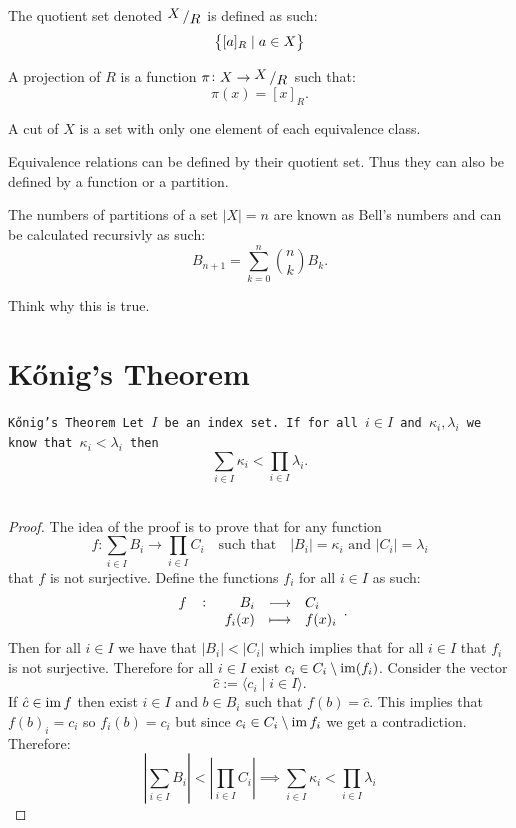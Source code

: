 \documentclass[11pt,a4paper]{article}
\begin{document}
    \begin{definition}
			The quotient set denoted $\bigslant{X}{R}$ is defined as such:
			\[
        \left\{[a]_R \mid a \in X\right\}
			\]
		\end{definition}

    \begin{definition}[Projection]
			A projection of $R$ is a function $\pi \colon X \to \bigslant{X}{R}$
      such that:
			\[
				\pi(x) = [x]_R.
			\]
		\end{definition}

    \begin{definition}[Cut]
			A cut of $X$ is a set with only one element of each 
			equivalence class.
		\end{definition}
	\noindent Equivalence relations can be defined by their quotient set.
	Thus they can also be defined by a function or a partition.
	
  \begin{definition}
  The numbers of partitions of a set $|X|=n$ are known as Bell's numbers 
	and can be calculated recursivly as such:
	\[
    B_{n+1} = \sum_{k=0}^{n} \binom{n}{k} B_k.
	\]
  \end{definition}
	
  Think why this is true.
	
\newpage
\section{Kőnig's Theorem}
  \begin{theorem}\tt{Kőnig's Theorem}
  Let $I$ be an index set. If for all $i \in I$ and 
	$\kappa_i, \lambda_i$ we know that $\kappa_i < \lambda_i$ then
	\[
		\sum_{i\in I} \kappa_i < \prod_{i\in I} \lambda_i.
	\]
	\end{theorem}

  \begin{proof}
    The idea of the proof is to prove that for any function
    \[
      f \colon \sum_{i\in I}{B_i} \to \prod_{i\in I}{C_i} 
      \quad\text{such that}\quad
      |B_i| = \kappa_i \text{ and } |C_i| = \lambda_i
    \]
    that $f$ is not surjective.
    Define the functions $f_i$ for all $i \in I$ as such:
    \[
      \fullfunction{f}{B_i}{C_i}{f_i(x)}{f(x)_i}.
    \]
    Then for all $i \in I$ we have that $|B_i| < |C_i|$
    which implies that for all $i \in I$ that $f_i$ is not surjective.
    Therefore for all $i \in I$ exist 
    $c_i \in C_i \setminus \operatorname{im}(f_i)$.
    Consider the vector
    \[
      \hat{c} := \langle c_i \mid i \in I \rangle.
    \]
    If $\hat{c} \in \operatorname{im} f$ then exist $i \in I$ and 
    $b \in B_i$ such that $f(b) = \hat{c}$.
    This implies that $f(b)_i = c_i$
    so $f_i(b) = c_i$ but since $c_i \in C_i \setminus \operatorname{im} f_i$
    we get a contradiction.
    Therefore: 
    \[
      \left| \sum_{i\in I} B_i \right| <
      \left|\prod_{i\in I} C_i \right| 
      \implies
      \sum_{i\in I}{\kappa_i} < \prod_{i\in I}{\lambda_i}
    \]
  \end{proof}
\end{document}
